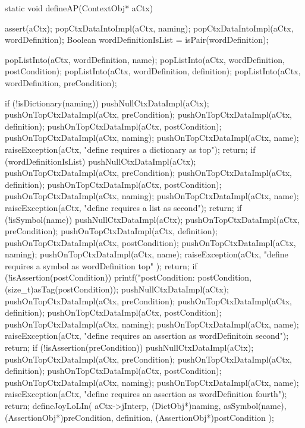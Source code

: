 static void defineAP(ContextObj* aCtx) {
  assert(aCtx);
  popCtxDataIntoImpl(aCtx,    naming);
  popCtxDataIntoImpl(aCtx,    wordDefinition);
  Boolean wordDefinitionIsList = isPair(wordDefinition);
  
  popListInto(aCtx, wordDefinition, name);
  popListInto(aCtx, wordDefinition, postCondition);
  popListInto(aCtx, wordDefinition, definition);
  popListInto(aCtx, wordDefinition, preCondition);

  if (!isDictionary(naming)) {
    pushNullCtxDataImpl(aCtx);
    pushOnTopCtxDataImpl(aCtx, preCondition);
    pushOnTopCtxDataImpl(aCtx, definition);
    pushOnTopCtxDataImpl(aCtx, postCondition);
    pushOnTopCtxDataImpl(aCtx, naming);
    pushOnTopCtxDataImpl(aCtx, name);
    raiseException(aCtx,
      "define requires a dictionary as top");
    return;
  }
  if (wordDefinitionIsList) {
    pushNullCtxDataImpl(aCtx);
    pushOnTopCtxDataImpl(aCtx, preCondition);
    pushOnTopCtxDataImpl(aCtx, definition);
    pushOnTopCtxDataImpl(aCtx, postCondition);
    pushOnTopCtxDataImpl(aCtx, naming);
    pushOnTopCtxDataImpl(aCtx, name);
    raiseException(aCtx,
      "define requires a list as second");
    return;
  }
  if (!isSymbol(name)) {
    pushNullCtxDataImpl(aCtx);
    pushOnTopCtxDataImpl(aCtx, preCondition);
    pushOnTopCtxDataImpl(aCtx, definition);
    pushOnTopCtxDataImpl(aCtx, postCondition);
    pushOnTopCtxDataImpl(aCtx, naming);
    pushOnTopCtxDataImpl(aCtx, name);
    raiseException(aCtx,
      "define requires a symbol as wordDefinition top"
    );
    return;
  }
  if (!isAssertion(postCondition)) {
    printf("postCondition: %
      postCondition, (size_t)asTag(postCondition));
    pushNullCtxDataImpl(aCtx);
    pushOnTopCtxDataImpl(aCtx, preCondition);
    pushOnTopCtxDataImpl(aCtx, definition);
    pushOnTopCtxDataImpl(aCtx, postCondition);
    pushOnTopCtxDataImpl(aCtx, naming);
    pushOnTopCtxDataImpl(aCtx, name);
    raiseException(aCtx,
      "define requires an assertion as wordDefinitoin second");
    return;
  }
  if (!isAssertion(preCondition)) {
    pushNullCtxDataImpl(aCtx);
    pushOnTopCtxDataImpl(aCtx, preCondition);
    pushOnTopCtxDataImpl(aCtx, definition);
    pushOnTopCtxDataImpl(aCtx, postCondition);
    pushOnTopCtxDataImpl(aCtx, naming);
    pushOnTopCtxDataImpl(aCtx, name);
    raiseException(aCtx,
      "define requires an assertion as wordDefinition fourth");
    return;
  }
  defineJoyLoLIn(
    aCtx->jInterp,
    (DictObj*)naming,
    asSymbol(name),
    (AssertionObj*)preCondition,
    definition,
    (AssertionObj*)postCondition
  );
}
\stopCCode

